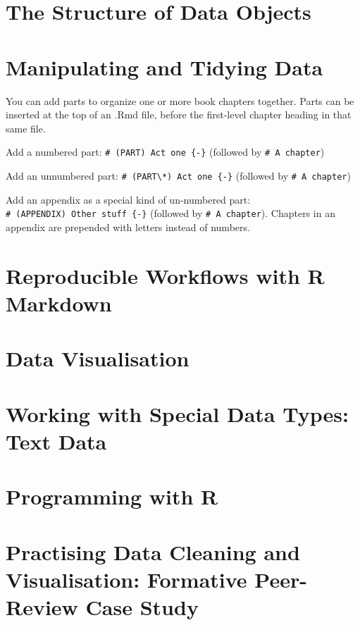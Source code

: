 \documentclass[
]{book}
\begin{document}
\hypertarget{the-structure-of-data-objects}{%
\chapter{The Structure of Data Objects}\label{the-structure-of-data-objects}}

\hypertarget{manipulating-and-tidying-data}{%
\chapter{Manipulating and Tidying Data}\label{manipulating-and-tidying-data}}

You can add parts to organize one or more book chapters together. Parts can be inserted at the top of an .Rmd file, before the first-level chapter heading in that same file.

Add a numbered part: \texttt{\#\ (PART)\ Act\ one\ \{-\}} (followed by \texttt{\#\ A\ chapter})

Add an unnumbered part: \texttt{\#\ (PART\textbackslash{}*)\ Act\ one\ \{-\}} (followed by \texttt{\#\ A\ chapter})

Add an appendix as a special kind of un-numbered part: \texttt{\#\ (APPENDIX)\ Other\ stuff\ \{-\}} (followed by \texttt{\#\ A\ chapter}). Chapters in an appendix are prepended with letters instead of numbers.

\hypertarget{reproducible-workflows-with-r-markdown}{%
\chapter{Reproducible Workflows with R Markdown}\label{reproducible-workflows-with-r-markdown}}

\hypertarget{data-visualisation}{%
\chapter{Data Visualisation}\label{data-visualisation}}

\hypertarget{working-with-special-data-types-text-data}{%
\chapter{Working with Special Data Types: Text Data}\label{working-with-special-data-types-text-data}}

\hypertarget{programming-with-r}{%
\chapter{Programming with R}\label{programming-with-r}}

\hypertarget{practising-data-cleaning-and-visualisation-formative-peer-review-case-study}{%
\chapter{Practising Data Cleaning and Visualisation: Formative Peer-Review Case Study}\label{practising-data-cleaning-and-visualisation-formative-peer-review-case-study}}

  
\end{document}
